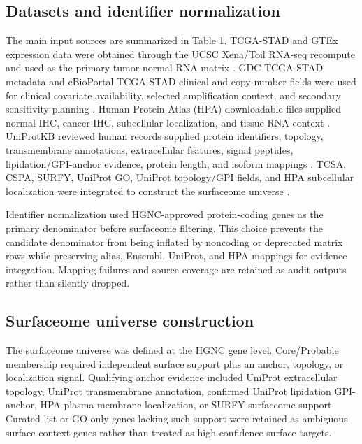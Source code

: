 \documentclass[twocolumn]{article}
\begin{document}
\subsection{Datasets and identifier normalization}

The main input sources are summarized in Table 1. TCGA-STAD and GTEx expression data were obtained through the UCSC Xena/\allowbreak{}Toil RNA-seq recompute and used as the primary tumor-normal RNA matrix \cite{goldman2020xena,vivian2017toil}. GDC TCGA-STAD metadata and cBioPortal TCGA-STAD clinical and copy-number fields were used for clinical covariate availability, selected amplification context, and secondary sensitivity planning \cite{grossman2016gdc,cerami2012cbioportal}. Human Protein Atlas (HPA) downloadable files supplied normal IHC, cancer IHC, subcellular localization, and tissue RNA context \cite{uhlen2015hpa}. UniProtKB reviewed human records supplied protein identifiers, topology, transmembrane annotations, extracellular features, signal peptides, lipidation/\allowbreak{}GPI-anchor evidence, protein length, and isoform mappings \cite{uniprot2025}. TCSA, CSPA, SURFY, UniProt GO, UniProt topology/\allowbreak{}GPI fields, and HPA subcellular localization were integrated to construct the surfaceome universe \cite{hu2021surfaceome,bauschfluck2015cspa,bauschfluck2018surfy}.

Identifier normalization used HGNC-approved protein-coding genes as the primary denominator before surfaceome filtering. This choice prevents the candidate denominator from being inflated by noncoding or deprecated matrix rows while preserving alias, Ensembl, UniProt, and HPA mappings for evidence integration. Mapping failures and source coverage are retained as audit outputs rather than silently dropped.

\subsection{Surfaceome universe construction}

The surfaceome universe was defined at the HGNC gene level. Core/\allowbreak{}Probable membership required independent surface support plus an anchor, topology, or localization signal. Qualifying anchor evidence included UniProt extracellular topology, UniProt transmembrane annotation, confirmed UniProt lipidation GPI-anchor, HPA plasma membrane localization, or SURFY surfaceome support. Curated-list or GO-only genes lacking such support were retained as ambiguous surface-context genes rather than treated as high-confidence surface targets.
\end{document}
